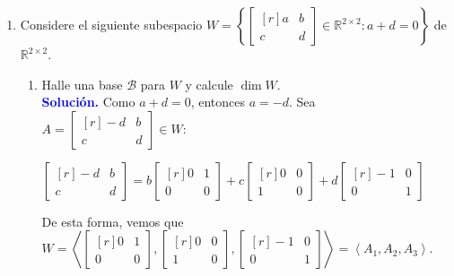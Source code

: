 \documentclass[11pt]{article}
\newcommand{\solution}{\textcolor{blue}{\textbf{Solución. }}}
\begin{document}
\begin{enumerate}
	\item Considere el siguiente subespacio $W = \left\{
	\begin{bmatrix*}[r]
	    a & b \\ 
	    c & d
	\end{bmatrix*} \in \mathbb{R}^{2\times 2}:a+d=0 \right\}$ de $\mathbb{R}^{2\times 2}$.
	\begin{enumerate}
		\item Halle una base $\mathcal{B}$ para $W$ y calcule $\dim W$. \\
		\solution Como $a+d=0$, entonces $a=-d$. Sea $A = 
		\begin{bmatrix*}[r]
		    -d & b \\
	    	c & d
		\end{bmatrix*} \in W$:
		\begin{center}
		    $\begin{bmatrix*}[r]
		        -d & b \\ 
		        c & d
		    \end{bmatrix*} = b
		    \begin{bmatrix*}[r]
		        0 & 1 \\ 
		        0 & 0
		    \end{bmatrix*} + c
		    \begin{bmatrix*}[r]
		        0 & 0 \\ 
	        	1 & 0
		    \end{bmatrix*} + d
		    \begin{bmatrix*}[r]
		        -1 & 0 \\ 
		         0 & 1
	    	\end{bmatrix*}$
		\end{center}
		
		De esta forma, vemos que $W = \left\langle 
		\begin{bmatrix*}[r]
		    0 & 1 \\ 
		    0 & 0
		\end{bmatrix*},
		\begin{bmatrix*}[r]
		    0 & 0 \\ 
		    1 & 0
		\end{bmatrix*}, 
		\begin{bmatrix*}[r]
		-   1 & 0 \\ 
		    0 & 1
		\end{bmatrix*} \right\rangle = \left\langle A_1,A_2,A_3 \right\rangle$. \par
		

\end{enumerate}
\end{enumerate}
\end{document}
